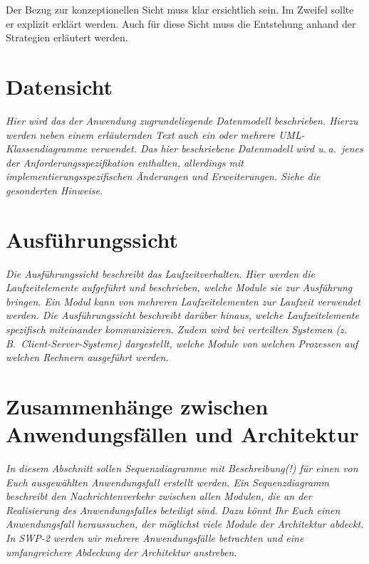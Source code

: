\documentclass[fontsize=12pt,paper=a4,twoside]{scrartcl}
\begin{document}
{  Der Bezug zur konzeptionellen Sicht muss klar ersichtlich sein. Im 
  Zweifel sollte er explizit erklärt werden. Auch für diese Sicht muss 
  die Entstehung anhand der Strategien erläutert werden.
}


\section{Datensicht} \label{sec:datensicht}

{ \em Hier wird das der Anwendung zugrundeliegende Datenmodell 
  beschrieben. Hierzu werden neben einem erläuternden Text auch ein 
  oder mehrere {UML}-Klassendiagramme verwendet. Das hier beschriebene 
  Datenmodell wird u.\,a.\ jenes der Anforderungsspezifikation 
  enthalten, allerdings mit implementierungsspezifischen Änderungen 
  und Erweiterungen. Siehe die gesonderten Hinweise.
}


\section{Ausführungssicht} \label{sec:ausfuehrung}
\nurlangversion

{ \em Die Ausführungssicht beschreibt das Laufzeitverhalten. Hier 
  werden die Laufzeitelemente aufgeführt und beschrieben, welche 
  Module sie zur Ausführung bringen. Ein Modul kann von mehreren 
  Laufzeitelementen zur Laufzeit verwendet werden. Die 
  Ausführungssicht beschreibt darüber hinaus, welche Laufzeitelemente 
  spezifisch miteinander kommunizieren. Zudem wird bei verteilten 
  Systemen (z.\,B.\ Client-Server-Systeme) dargestellt, welche Module 
  von welchen Prozessen auf welchen Rechnern ausgeführt werden.
}


\section{Zusammenhänge zwischen Anwendungsfällen und Architektur}
\label{sec:anwendungsfaelle}

{ \em In diesem Abschnitt sollen Sequenzdiagramme mit Beschreibung(!) 
  für 
           {einen von Euch ausgewählten Anwendungsfall}
  erstellt werden. Ein Sequenzdiagramm beschreibt den 
  Nachrichtenverkehr zwischen allen Modulen, die an der Realisierung 
  des Anwendungsfalles beteiligt sind.
  {Dazu könnt Ihr Euch einen Anwendungsfall heraussuchen, der 
  möglichst viele Module der Architektur abdeckt. In SWP-2 werden wir 
  mehrere Anwendungsfälle betrachten und eine umfangreichere Abdeckung 
  der Architektur anstreben.}
}
\end{document}
